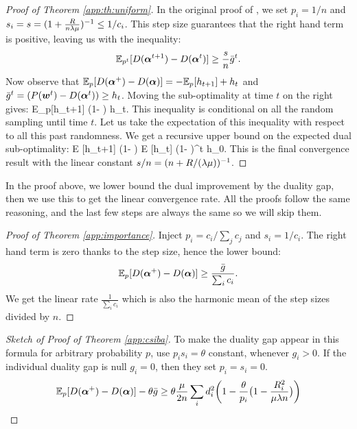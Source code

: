 \begin{subappendices}
	\begin{proof}[Proof of Theorem \ref{app:th:uniform}]
		In the original proof of \citet{shalev-shwartz_accelerated_2013-1}, we set $p_i=1/n$ and $s_i = s = (1+ \frac{R}{n \lambda \mu} )^{-1}  \leq 1/c_i$. This step size guarantees that the right hand term is positive, leaving us with the inequality:
		\begin{equation}
			\mathbb E_{p^t}[D(\boldsymbol{\alpha}^{t+1}) - D(\boldsymbol{\alpha}^t)]
			\geq \frac{s}{n} \bar g^t.
			\label{app:eq:uniform ascent lemma}
		\end{equation}
		Now observe that $\mathbb E_p[D(\boldsymbol{\alpha}^+) - D(\boldsymbol{\alpha})] = - \mathbb E_p[h_{t+1}] + h_t$ and $\bar g^t = (P(\boldsymbol{w}^t) - D(\boldsymbol{\alpha}^t)) \geq h_t$.
		Moving the sub-optimality at time $t$ on the right gives:
		\beq
		\mathbb E_p[h_{t+1}] \leq (1-  ) h_t.
		\eeq
		This inequality is conditional on all the random sampling until time $t$.
		Let us take the expectation of this inequality with respect to all this past randomness.
		We get a recursive upper bound on the expected dual sub-optimality:
		\beq
		\mathbb E [h_{t+1}] \leq (1-  ) \mathbb E [h_t] \leq (1-  )^t h_0.
		\eeq
		This is the final convergence result with the linear constant $s/n = (n+R/(\lambda \mu))^{-1}$.
	\end{proof}
	
	In the proof above, we lower bound the dual improvement by the duality gap, then we use this to get the linear convergence rate.
	All the proofs follow the same reasoning, and the last few steps are always the same so we will skip them.
	
	\begin{proof}[Proof of Theorem \ref{app:importance}]
		Inject $p_i=c_i/\sum_j c_j$ and $s_i = 1/c_i$. The right hand term is zero thanks to the step size, hence the lower bound:
		\begin{equation}
			\mathbb E_p[D(\boldsymbol{\alpha}^+) - D(\boldsymbol{\alpha})]
			\geq \frac{\bar g}{\sum_i c_i} .
		\end{equation}
		We get the linear rate   $\frac{1}{\sum_i c_i}$ which is also the harmonic mean of the step sizes divided by $n$.
	\end{proof}
	
	\begin{proof}[Sketch of Proof of Theorem \ref{app:csiba}]
		To make the duality gap appear in this formula for arbitrary probability $p$, \citet{csiba2015stochastic} use $p_i s_i = \theta$ constant, whenever $g_i > 0$.
		If the individual duality gap is null $g_i=0$, then they set $p_i=s_i=0$.
		\begin{equation}
			\mathbb E_p[D(\boldsymbol{\alpha}^+) - D(\boldsymbol{\alpha})] - \theta \bar g
			\geq \theta \frac{\mu}{2 n} \sum_i  d_i^2\bigg ( 1 -  \frac{\theta}{p_i} \big ( 1 - \frac{R_i^2}{\mu \lambda n} \big ) \bigg )
		\end{equation}
		

\end{proof}
\end{subappendices}
